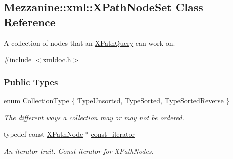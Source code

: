 \hypertarget{classMezzanine_1_1xml_1_1XPathNodeSet}{
\subsection{Mezzanine::xml::XPathNodeSet Class Reference}
\label{classMezzanine_1_1xml_1_1XPathNodeSet}
}


A collection of nodes that an \hyperlink{classMezzanine_1_1xml_1_1XPathQuery}{XPathQuery} can work on.  




{\ttfamily \#include $<$xmldoc.h$>$}

\subsubsection*{Public Types}
\begin{DoxyCompactItemize}
\item 
enum \hyperlink{classMezzanine_1_1xml_1_1XPathNodeSet_aea2172f847690de3cd556c2d4ffca2a7}{CollectionType} \{ \hyperlink{classMezzanine_1_1xml_1_1XPathNodeSet_aea2172f847690de3cd556c2d4ffca2a7a8a9797ed8a15077d952e7a26819997f0}{TypeUnsorted}, 
\hyperlink{classMezzanine_1_1xml_1_1XPathNodeSet_aea2172f847690de3cd556c2d4ffca2a7a27f67feb20844acf838f3f4f348fb44d}{TypeSorted}, 
\hyperlink{classMezzanine_1_1xml_1_1XPathNodeSet_aea2172f847690de3cd556c2d4ffca2a7a954881d88b3d6c9af5d0213d1c2cc231}{TypeSortedReverse}
 \}
\begin{DoxyCompactList}\small\item\em The different ways a collection may or may not be ordered. \item\end{DoxyCompactList}\item 
\hypertarget{classMezzanine_1_1xml_1_1XPathNodeSet_a8dc7ab5e016c2bf41bbe451cc45121a7}{
typedef const \hyperlink{classMezzanine_1_1xml_1_1XPathNode}{XPathNode} $\ast$ \hyperlink{classMezzanine_1_1xml_1_1XPathNodeSet_a8dc7ab5e016c2bf41bbe451cc45121a7}{const\_\-iterator}}
\label{classMezzanine_1_1xml_1_1XPathNodeSet_a8dc7ab5e016c2bf41bbe451cc45121a7}

\begin{DoxyCompactList}\small\item\em An iterator trait. Const iterator for XPathNodes. \item\end{DoxyCompactList}\end{DoxyCompactItemize}

